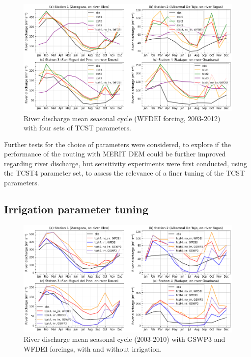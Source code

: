 \begin{figure}[htbp]
    \centering
    \includegraphics[width=\textwidth]{images/chap3/river_discharge/merit_tcst_4stations_SC.png}
    \caption{River discharge mean seasonal cycle (WFDEI forcing, 2003-2012) with four sets of TCST parameters.}
    \label{fig:merit_tcsts_stations_SC}
\end{figure}

Further tests for the choice of parameters were considered, to explore if the performance of the \native routing with MERIT DEM could be further improved regarding river discharge, but sensitivity experiments were first conducted, using the TCST4 parameter set, to assess the relevance of a finer tuning of the TCST parameters.

\subsection{Irrigation parameter tuning}
\label{sec:forcing_irr_reduced}

\begin{figure}[htbp]
    \centering
    \includegraphics[width=\textwidth]{images/chap3/river_discharge/merit_forcing_4stations_SC.png}
    \caption{River discharge mean seasonal cycle (2003-2010) with GSWP3 and WFDEI forcings, with and without irrigation.}
    \label{fig:merit_forcing_stations_SC}
\end{figure}

